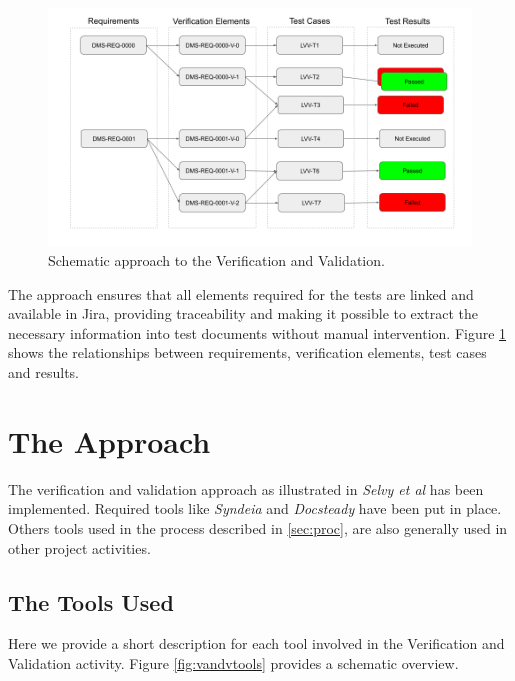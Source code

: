 \begin{figure}
\begin{center}
\includegraphics[width=\textwidth]{imgs/VandVSchema.png}
 \caption{Schematic approach to the Verification and Validation.}
 \label{fig:vandvschema}
\end{center}
\end{figure}

The approach ensures that all elements required for the tests are linked and available in Jira, 
providing traceability and making it possible to extract the necessary information into test documents without manual intervention.
Figure \ref{fig:vandvschema} shows the relationships between requirements, verification elements, test cases and results.


\section{The Approach}

The verification and validation approach as illustrated in  \textit{Selvy et al}\cite{10.1117/12.2310125}  has been implemented.
Required tools like \textit{Syndeia} and \textit{Docsteady} have been put in place.
Others tools used in the process described in \ref{sec:proc}, are also generally used in other project activities.


\subsection{The Tools Used}

Here we provide a short description for each tool involved in the Verification and Validation activity.
Figure \ref{fig:vandvtools} provides a schematic overview.


